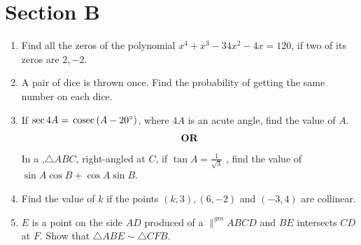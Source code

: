 \documentclass[journal,12pt,twocolumn]{IEEEtran}
\renewcommand\thesection{\arabic{section}}
\begin{document}
\section{Section B}
\renewcommand{\theequation}{\theenumi}
\begin{enumerate}[label=\thesection.\arabic*.,ref=\thesection.\theenumi]
\item Find all the zeros of the polynomial $x^4+x^3-34x^2-4x=120$, if two of its zeros are $2,-2$.\\
\item A pair of dice is thrown once. Find the probability of getting the same number on each dice. \\
\item If $\sec4A=\,\text{cosec}\,(A-20\degree)$, where $4A$ is an acute angle, find the value of $A$.\\
\begin{align}
	\centering \vec{OR}\nonumber
\end{align}
In a ,$\triangle ABC$, right-angled at $C$, if $\tan A=\frac{1}{\sqrt{3}}$ , find the value of $\sin A \cos B+ \cos A \sin B$.\\
\item Find the value of $k$ if the points $(k, 3), (6, -2)$ and $(-3, 4)$ are collinear.\\
\item $E$ is a point on the side $AD$ produced of a $\parallel^{gm} ABCD$ and $BE$ intersects $CD$ at $F$. Show that $\triangle ABE \sim \triangle CFB$.
\end{enumerate}
\end{document}
